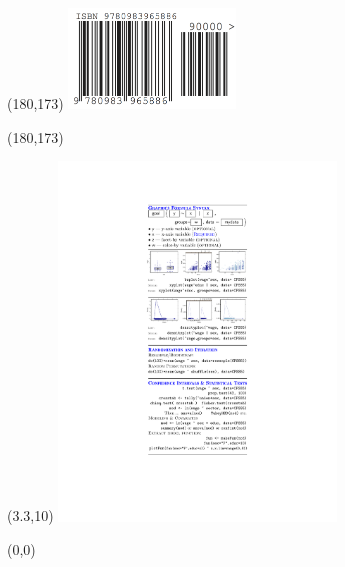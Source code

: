 \documentclass{article}
\begin{document}
\begin{textblock}{1.65}(180,173)   %
\noindent\includegraphics[width=1.75in]{../../CoverImages/ISBN-8-6.png}
\end{textblock}
\begin{textblock}{1.65}(180,173)
\noindent{}
\end{textblock}




\begin{textblock}{3}(3.3,10)
\noindent\includegraphics[width=2.9in]{backflap.pdf}
\end{textblock}

\begin{textblock}{3}(0,0)
\noindent{}
\end{textblock}

\end{document}
